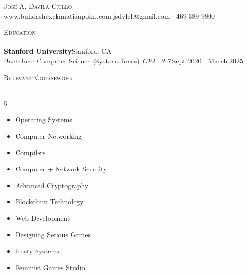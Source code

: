 \documentclass[a4paper]{article}
\newcommand{\lineunder} {
    \vspace*{-8pt} \\
    \hspace*{-18pt} \hrulefill \\
}
\newcommand{\header} [1] {
    {\hspace*{-18pt}\vspace*{6pt} \textsc{#1}}
    \vspace*{-6pt} \lineunder
}
\begin{document}
\vspace*{-40pt}

    

\vspace*{-10pt}
\begin{center}
	{\Huge \scshape {José A. Davila-Ciullo}}\\
	  www.buhdashexclamationpoint.com \textbar{} jsdvlcll@gmail.com $\cdot$ 469-389-9800\\
\end{center}

\header{Education}
\textbf{Stanford University}\hfill Stanford, CA\\
Bachelors: Computer Science (Systems focus) \textit{GPA: 3.7} \hfill Sept 2020 - March 2025 \\
\vspace{2.5mm}

\header{Relevant Coursework}
\vspace{1mm}    
        \begin{multicols}{5}
            \begin{itemize}
                \setlength\itemsep{1mm}
                \item Operating Systems
                \item Computer Networking
                \item Compilers
                \item Computer + Network Security
                \item Advanced Cryptography
                \item Blockchain Technology
                \item Web Development
                \item Designing Serious Games
                \item Rusty Systems
                \item Feminist Games Studio
            \end{itemize}
        \end{multicols}
        \vspace{3mm}
    
\end{document}
